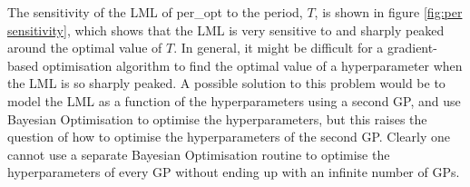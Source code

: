 The sensitivity of the LML of per\_opt to the period, $T$, is shown in figure \ref{fig:per sensitivity}, which shows that the LML is very sensitive to and sharply peaked around the optimal value of $T$. In general, it might be difficult for a gradient-based optimisation algorithm to find the optimal value of a hyperparameter when the LML is so sharply peaked. A possible solution to this problem would be to model the LML as a function of the hyperparameters using a second GP, and use Bayesian Optimisation \cite{snoek2012practical} to optimise the hyperparameters, but this raises the question of how to optimise the hyperparameters of the second GP. Clearly one cannot use a separate Bayesian Optimisation routine to optimise the hyperparameters of every GP without ending up with an infinite number of GPs.
